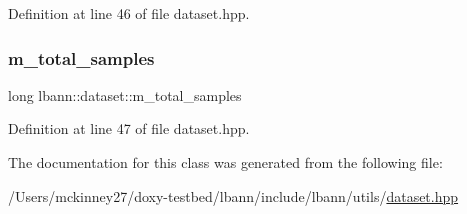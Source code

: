 Definition at line 46 of file dataset.\+hpp.

\mbox{\label{classlbann_1_1dataset_a2bfe72a2783e0a47e725e91dfb13d06a}} 
\subsubsection{\texorpdfstring{m\+\_\+total\+\_\+samples}{m\_total\_samples}}
{\footnotesize\ttfamily long lbann\+::dataset\+::m\+\_\+total\+\_\+samples\hspace{0.3cm}{\ttfamily [protected]}}



Definition at line 47 of file dataset.\+hpp.



The documentation for this class was generated from the following file\+:\begin{DoxyCompactItemize}
\item 
/\+Users/mckinney27/doxy-\/testbed/lbann/include/lbann/utils/\hyperlink{dataset_8hpp}{dataset.\+hpp}\end{DoxyCompactItemize}

